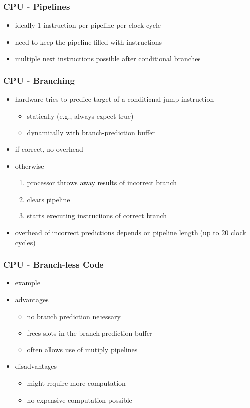 \begin{frame}
 \frametitle{CPU - Pipelines}


 \begin{itemize}
  \item ideally \( 1 \) instruction per pipeline per clock cycle
  \item need to keep the pipeline filled with instructions
  \item multiple next instructions possible after conditional branches
 \end{itemize}
\end{frame}

\begin{frame}
 \frametitle{CPU - Branching}
 \begin{itemize}
  \item hardware tries to predice target of a conditional jump instruction
   \begin{itemize}
    \item statically (e.g., always expect true)
    \item dynamically with branch-prediction buffer
   \end{itemize}
  \item if correct, no overhead
  \item otherwise
  \begin{enumerate}
   \item processor throws away results of incorrect branch
   \item clears pipeline
   \item starts executing instructions of correct branch
  \end{enumerate}
  \item overhead of incorrect predictions depends on pipeline length (up to \( 20 \) clock cycles)
 \end{itemize}
\end{frame}

\begin{frame}
 \frametitle{CPU - Branch-less Code}
 \begin{itemize}
  \item example 
  \item advantages
  \begin{itemize}
   \item no branch prediction necessary
   \item frees slots in the branch-prediction buffer
   \item often allows use of mutiply pipelines
  \end{itemize}
  \item disadvantages
  \begin{itemize}
   \item might require more computation
   \item no expensive computation possible
  \end{itemize}
 \end{itemize}
\end{frame}

